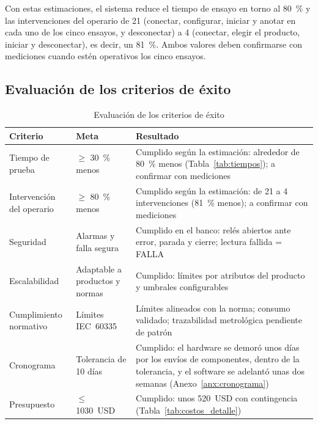 Con estas estimaciones, el sistema reduce el tiempo de ensayo en torno al
\SI{80}{\percent} y las intervenciones del operario de 21 (conectar, configurar,
iniciar y anotar en cada uno de los cinco ensayos, y desconectar) a 4 (conectar,
elegir el producto, iniciar y desconectar), es decir, un \SI{81}{\percent}.
Ambos valores deben confirmarse con mediciones cuando estén operativos los cinco
ensayos.

\subsection{Evaluación de los criterios de éxito}
\label{subsec:resultados_criterios}

\begin{table}[htbp]
\centering
\caption{Evaluación de los criterios de éxito}
\label{tab:criterios_exito}
\renewcommand{\arraystretch}{1.25}
\small
\begin{tabularx}{\linewidth}{@{} l l X @{}}
\toprule
\textbf{Criterio} & \textbf{Meta} & \textbf{Resultado} \\
\midrule
Tiempo de prueba & $\geq$ \SI{30}{\percent} menos
  & Cumplido según la estimación: alrededor de \SI{80}{\percent} menos
    (Tabla~\ref{tab:tiempos}); a confirmar con mediciones \\
Intervención del operario & $\geq$ \SI{80}{\percent} menos
  & Cumplido según la estimación: de 21 a 4 intervenciones
    (\SI{81}{\percent} menos); a confirmar con mediciones \\
Seguridad & Alarmas y falla segura
  & Cumplido en el banco: relés abiertos ante error, parada y cierre;
    lectura fallida = FALLA \\
Escalabilidad & Adaptable a productos y normas
  & Cumplido: límites por atributos del producto y umbrales configurables \\
Cumplimiento normativo & Límites IEC~60335
  & Límites alineados con la norma; consumo validado; trazabilidad metrológica
    pendiente de patrón \\
Cronograma & Tolerancia de 10 días
  & Cumplido: el hardware se demoró unos días por los envíos de componentes,
    dentro de la tolerancia, y el software se adelantó unas dos semanas
    (Anexo~\ref{anx:cronograma}) \\
Presupuesto & $\leq$ \SI{1030}{USD}
  & Cumplido: unos \SI{520}{USD} con contingencia
    (Tabla~\ref{tab:costos_detalle}) \\
\bottomrule
\end{tabularx}
\end{table}
